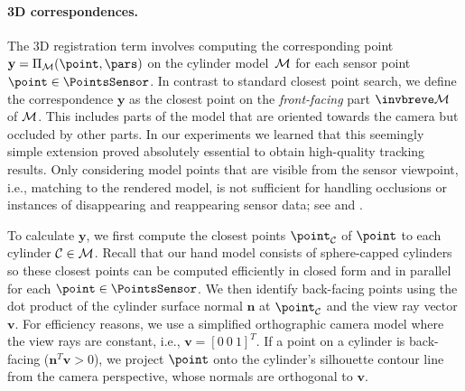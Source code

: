


\paragraph*{3D correspondences.}
The 3D registration term involves computing the corresponding point  $\mathbf{y} = \proj_{\handmodel}(\point,\pars)$ on the cylinder model~$\mathcal{M}$ for each sensor point $\point \in \PointsSensor$. 
In contrast to standard closest point search, we define the correspondence $\mathbf{y}$  as the closest point on the \emph{front-facing} part $\visiblehand$ of $\mathcal{M}$. This includes parts of the model that are oriented towards the camera but occluded by other parts. 
 In our experiments we learned that this seemingly simple extension proved absolutely essential to obtain high-quality tracking results.
 Only considering model points that are visible from the sensor viewpoint, i.e., matching to the rendered model, is not sufficient for handling occlusions or instances of disappearing and reappearing sensor data; see  and . 
 
To calculate $\mathbf{y}$, we first compute the closest points $\point_\mathcal{C}$ of $\point$ to each cylinder $\mathcal{C}\in\mathcal{M}$. Recall that our hand model consists of sphere-capped cylinders so these closest points can be computed efficiently in closed form and in parallel for each $\point \in \PointsSensor$.
We then identify back-facing points using the dot product of the cylinder surface normal $\mathbf{n}$ at $\point_\mathcal{C}$ and the view ray vector $\mathbf{v}$. 
%
For efficiency reasons, we use a simplified orthographic camera model where the view rays are constant, i.e., $\mathbf{v} = [0~0~1]^T$. If a point on a cylinder is back-facing ($\mathbf{n}^T\mathbf{v}>0$), we project $\point$ onto the cylinder's silhouette contour line from the camera perspective, whose normals are orthogonal to $\mathbf{v}$.

